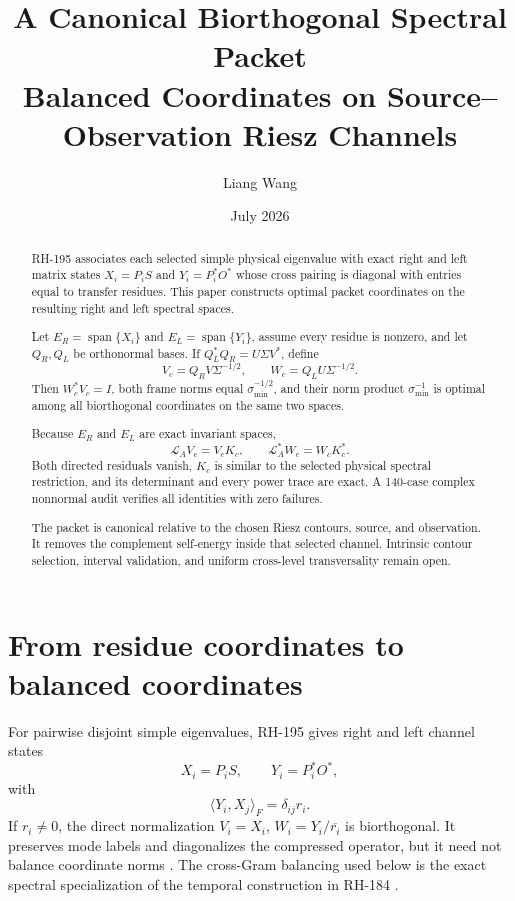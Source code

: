\documentclass[12pt]{article}
\title{A Canonical Biorthogonal Spectral Packet\\
\large Balanced Coordinates on Source--Observation Riesz Channels}
\author{Liang Wang}
\date{July 2026}
\theoremstyle{remark}
\begin{document}
\maketitle

\begin{abstract}
RH-195 associates each selected simple physical eigenvalue with exact right
and left matrix states $X_i=P_iS$ and $Y_i=P_i^*O^*$ whose cross pairing is
diagonal with entries equal to transfer residues.  This paper constructs
optimal packet coordinates on the resulting right and left spectral spaces.

Let $E_R=\operatorname{span}\{X_i\}$ and
$E_L=\operatorname{span}\{Y_i\}$, assume every residue is nonzero, and let
$Q_R,Q_L$ be orthonormal bases.  If
$Q_L^*Q_R=U\Sigma V^*$, define
\[
 V_c=Q_RV\Sigma^{-1/2},
 \qquad
 W_c=Q_LU\Sigma^{-1/2}.
\]
Then $W_c^*V_c=I$, both frame norms equal
$\sigma_{\min}^{-1/2}$, and their norm product
$\sigma_{\min}^{-1}$ is optimal among all biorthogonal coordinates on the
same two spaces.

Because $E_R$ and $E_L$ are exact invariant spaces,
\[
 \mathcal L_AV_c=V_cK_c,
 \qquad
 \mathcal L_A^*W_c=W_cK_c^*.
\]
Both directed residuals vanish, $K_c$ is similar to the selected physical
spectral restriction, and its determinant and every power trace are exact.
A 140-case complex nonnormal audit verifies all identities with zero
failures.

The packet is canonical relative to the chosen Riesz contours, source, and
observation.  It removes the complement self-energy inside that selected
channel.  Intrinsic contour selection, interval validation, and uniform
cross-level transversality remain open.
\end{abstract}

\section{From residue coordinates to balanced coordinates}

For pairwise disjoint simple eigenvalues, RH-195 gives right and left channel
states
\begin{equation}\label{eq:channel-states}
 X_i=P_iS,
 \qquad Y_i=P_i^*O^*,
\end{equation}
with
\begin{equation}\label{eq:residue-cross}
 \langle Y_i,X_j\rangle_F=\delta_{ij}r_i.
\end{equation}
If $r_i\ne0$, the direct normalization
$V_i=X_i$, $W_i=Y_i/\overline{r_i}$ is biorthogonal.  It preserves mode
labels and diagonalizes the compressed operator, but it need not balance
coordinate norms \citep{WangRH195}.  The cross-Gram balancing used below is
the exact spectral specialization of the temporal construction in
RH-184 \citep{WangRH184}.
\end{document}
